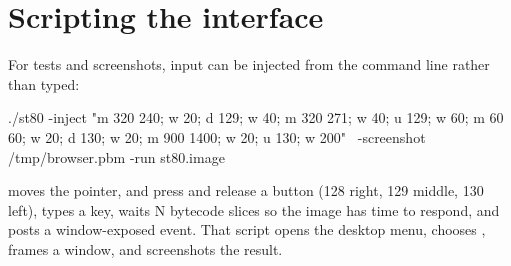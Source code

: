 \section{Scripting the interface}

For tests and screenshots, input can be injected from the command line rather
than typed:

\begin{sh}
./st80 -inject "m 320 240; w 20; d 129; w 40; m 320 271; w 40; u 129; w 60;
                m 60 60; w 20; d 130; w 20; m 900 1400; w 20; u 130; w 200" \
       -screenshot /tmp/browser.pbm -run st80.image
\end{sh}

 moves the pointer,  and  press and release a button
(128 right, 129 middle, 130 left), \ct{k} types a key, \ct{w N} waits N bytecode
slices so the image has time to respond, and \ct{x} posts a window-exposed
event. That script opens the desktop menu, chooses \ct{browser}, frames a
window, and screenshots the result.
